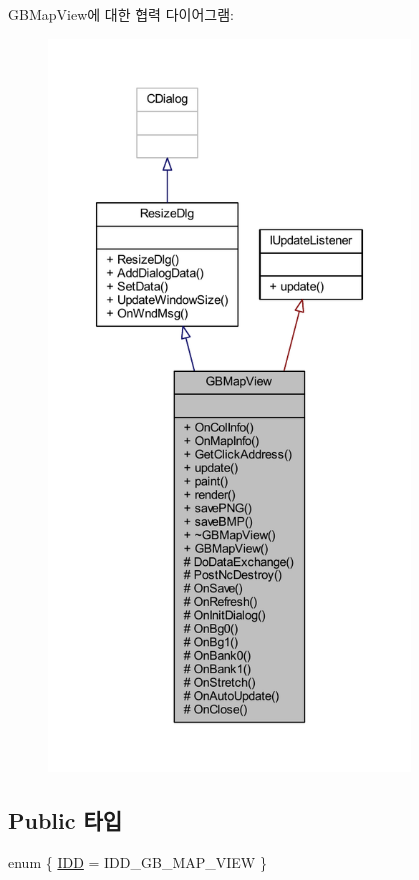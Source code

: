 G\+B\+Map\+View에 대한 협력 다이어그램\+:\nopagebreak
\begin{figure}[H]
\begin{center}
\leavevmode
\includegraphics[height=550pt]{class_g_b_map_view__coll__graph}
\end{center}
\end{figure}
\subsection*{Public 타입}
\begin{DoxyCompactItemize}
\item 
enum \{ \mbox{\hyperlink{class_g_b_map_view_a7888981cacff337e7de3a48be4a69e95a9f52d893a13755f31b76360a8ea894ef}{I\+DD}} = I\+D\+D\+\_\+\+G\+B\+\_\+\+M\+A\+P\+\_\+\+V\+I\+EW
 \}
\end{DoxyCompactItemize}
